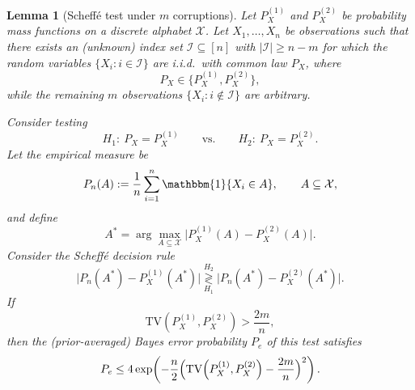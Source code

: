 \documentclass[11pt]{article}
\theoremstyle{plain}
\newtheorem{lemma}[theorem]{Lemma}
\theoremstyle{definition}
\begin{document}
\begin{lemma}[Scheff\'e test under $m$ corruptions]\label{thm:scheffe}
Let $P_X^{(1)}$ and $P_X^{(2)}$ be probability mass functions on a discrete alphabet $\mathcal{X}$.
Let $X_1,\dots,X_n$ be observations such that there exists an (unknown) index set
$\mathcal{I}\subseteq[n]$ with $|\mathcal{I}|\ge n-m$ for which the random variables
$\{X_i:i\in\mathcal{I}\}$ are i.i.d.\ with common law $P_X$, where
\[
P_X\in\{P_X^{(1)},P_X^{(2)}\},
\]
while the remaining $m$ observations $\{X_i:i\notin\mathcal{I}\}$ are arbitrary.

Consider testing
\[
H_1:\ P_X=P_X^{(1)}
\qquad\text{vs.}\qquad
H_2:\ P_X=P_X^{(2)}.
\]
Let the empirical measure be
\[
P_n(A):=\frac{1}{n}\sum_{i=1}^n \mathbbm{1}\{X_i\in A\},\qquad A\subseteq\mathcal{X},
\]
and define
\[
A^*=\arg\max_{A\subseteq\mathcal{X}} \bigl|P_X^{(1)}(A)-P_X^{(2)}(A)\bigr|.
\]
Consider the Scheff\'e decision rule
\[
\bigl|P_n(A^*)-P_X^{(1)}(A^*)\bigr|
\underset{H_1}{\overset{H_2}{\gtrless}}
\bigl|P_n(A^*)-P_X^{(2)}(A^*)\bigr|.
\]
If
\[
\mathrm{TV}\!\left(P_X^{(1)},P_X^{(2)}\right)>\frac{2m}{n},
\]
then the (prior-averaged) Bayes error probability $P_e$ of this test satisfies
\[
P_e \le 4\exp\!\left(-\frac{n}{2}\Bigl(\mathrm{TV}\!\left(P_X^{(1)},P_X^{(2)}\right)-\frac{2m}{n}\Bigr)^2\right).
\]
\end{lemma}
\end{document}
